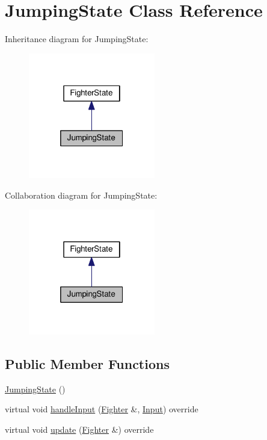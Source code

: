 \hypertarget{classJumpingState}{}\section{Jumping\+State Class Reference}
\label{classJumpingState}


Inheritance diagram for Jumping\+State\+:
\nopagebreak
\begin{figure}[H]
\begin{center}
\leavevmode
\includegraphics[width=157pt]{classJumpingState__inherit__graph}
\end{center}
\end{figure}


Collaboration diagram for Jumping\+State\+:
\nopagebreak
\begin{figure}[H]
\begin{center}
\leavevmode
\includegraphics[width=157pt]{classJumpingState__coll__graph}
\end{center}
\end{figure}
\subsection*{Public Member Functions}
\begin{DoxyCompactItemize}
\item 
\hyperlink{classJumpingState_a74a6fbd65de0937c949cb04d7567041f}{Jumping\+State} ()
\item 
virtual void \hyperlink{classJumpingState_a40be6d03f207fc425dfe2b1395fd4edb}{handle\+Input} (\hyperlink{classFighter}{Fighter} \&, \hyperlink{State_8cpp_a080a822f0093973313bd644e517a5090}{Input}) override
\item 
virtual void \hyperlink{classJumpingState_aef36270d1d3aec51bdf4770e9ad571c8}{update} (\hyperlink{classFighter}{Fighter} \&) override
\end{DoxyCompactItemize}
